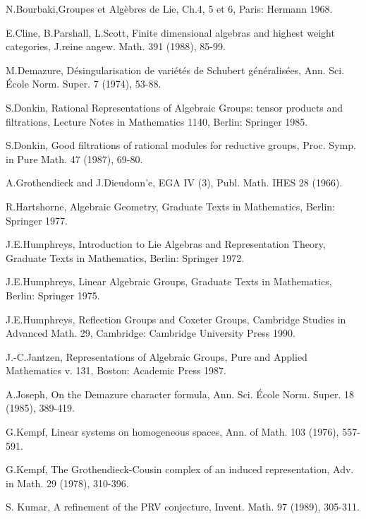 \begin{thebibliography}{}
 N.\@ Bourbaki,\pageoriginale Groupes et Alg\`ebres de
  Lie, Ch.\@ 4, 5 et 6, Paris: Hermann 1968.

 E.\@ Cline, B.\@ Parshall, L.\@ Scott, Finite
  dimensional algebras and highest weight categories, J.\@ reine
  angew. Math. 391 (1988), 85-99.

 M.\@ Demazure, D\'esingularisation de vari\'et\'es de
  Schubert g\'en\'eralis\'ees, Ann. Sci. \'Ecole Norm. Super. 7
  (1974), 53-88.

 S.\@ Donkin, Rational Representations of Algebraic
  Groups: tensor products and filtrations, Lecture Notes in
  Mathematics 1140, Berlin: Springer 1985.

 S.\@ Donkin, Good filtrations of rational modules for
  reductive groups, Proc. Symp. in Pure Math. 47 (1987), 69-80.

 A.\@ Grothendieck and J.\@ Dieudonn'e, EGA IV (3),
  Publ. Math. IHES 28 (1966).

 R.\@ Hartshorne, Algebraic Geometry, Graduate Texts in
  Mathematics, Berlin: Springer 1977.

 J.E.\@ Humphreys, Introduction to Lie Algebras and
  Representation Theory, Graduate Texts in Mathematics, Berlin:
  Springer 1972.

 J.E.\@ Humphreys, Linear Algebraic Groups, Graduate
  Texts in Mathematics, Berlin: Springer 1975.

 J.E.\@ Humphreys, Reflection Groups and Coxeter
  Groups, Cambridge Studies in Advanced Math. 29, Cambridge: Cambridge
  University Press 1990.

 J.-C.\@ Jantzen,\pageoriginale 
  Representations of Algebraic Groups,
  Pure and Applied Mathematics v. 131, Boston: Academic Press 1987.

 A.\@ Joseph, On the Demazure character formula,
  Ann. Sci. \'Ecole Norm. Super. 18 (1985), 389-419.

 G.\@ Kempf, Linear systems on homogeneous spaces,
  Ann. of Math. 103 (1976), 557-591.

 G.\@ Kempf, The Grothendieck-Cousin complex of an
  induced representation, Adv. in Math. 29 (1978), 310-396.

 S. Kumar, A refinement of the PRV conjecture,
  Invent. Math. 97 (1989), 305-311.


\end{thebibliography}
